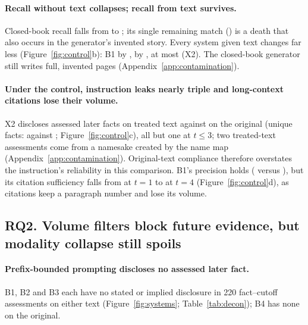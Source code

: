 \paragraph{Recall without text collapses; recall from text survives.}
Closed-book recall falls from  to ; its
single remaining match () is a death that also occurs in the
generator's invented story. Every system given text changes far less
(Figure~\ref{fig:control}b): B1 by , \sys by
, at most  (X2). The closed-book
generator still writes full, invented pages (Appendix~\ref{app:contamination}).

\paragraph{Under the control, instruction leaks nearly triple and long-context citations lose their volume.}
X2 discloses  assessed later facts on treated text against
 on the original (unique facts:  against
; Figure~\ref{fig:control}c), all but one at $t\le3$; two treated-text assessments
come from a namesake created by the name map (Appendix~\ref{app:contamination}).
Original-text compliance therefore overstates the instruction's reliability in this comparison. B1's precision holds
( versus ), but its citation sufficiency
falls from  at $t=1$ to  at $t=4$
(Figure~\ref{fig:control}d), as citations keep a paragraph number and lose its volume.


\subsection{RQ2. Volume filters block future evidence, but modality collapse still spoils}
\label{sec:results-main}

\paragraph{Prefix-bounded prompting discloses no assessed later fact.}
B1, B2 and B3 each have no stated or implied disclosure in 220 fact--cutoff assessments on
either text (Figure~\ref{fig:systems}; Table~\ref{tab:decon}); B4 has none on the original.

